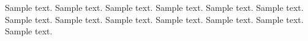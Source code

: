 \documentclass[preprint,12pt,3p]{elsarticle}
\begin{document}
Sample text. Sample text. Sample text. Sample text. Sample text. Sample text.
Sample text. Sample text. Sample text. Sample text. Sample text. Sample text.
Sample text.




% 
% 
% 
% 
% 
% 
% 
% 
% 
% 
% 
% 


\end{document}
